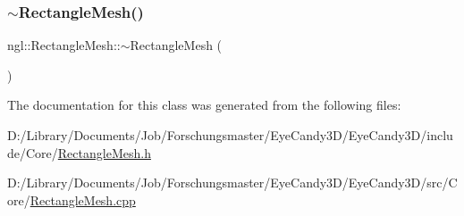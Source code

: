 \subsubsection{\texorpdfstring{$\sim$\+Rectangle\+Mesh()}{~RectangleMesh()}}
{\footnotesize\ttfamily ngl\+::\+Rectangle\+Mesh\+::$\sim$\+Rectangle\+Mesh (\begin{DoxyParamCaption}{ }\end{DoxyParamCaption})\hspace{0.3cm}{\ttfamily [virtual]}}



The documentation for this class was generated from the following files\+:\begin{DoxyCompactItemize}
\item 
D\+:/\+Library/\+Documents/\+Job/\+Forschungsmaster/\+Eye\+Candy3\+D/\+Eye\+Candy3\+D/include/\+Core/\mbox{\hyperlink{_rectangle_mesh_8h}{Rectangle\+Mesh.\+h}}\item 
D\+:/\+Library/\+Documents/\+Job/\+Forschungsmaster/\+Eye\+Candy3\+D/\+Eye\+Candy3\+D/src/\+Core/\mbox{\hyperlink{_rectangle_mesh_8cpp}{Rectangle\+Mesh.\+cpp}}\end{DoxyCompactItemize}
